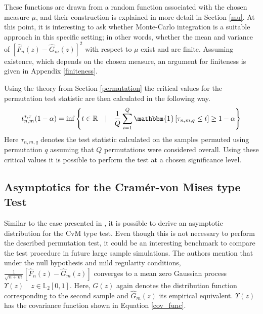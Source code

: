 \documentclass[12pt, a4paper]{article}
\theoremstyle{MAstyle} \newtheorem{assumption}{Assumption}[section]
\theoremstyle{MAstyle} \newtheorem{definition}{Definition}[section]
\theoremstyle{MAstyle} \newtheorem{theorem}{Theorem}[section]
\begin{document}
			These functions are drawn from a random function associated with the chosen measure $\mu$, and their construction is explained in more detail in Section \ref{mu}. At this point, it is interesting to ask whether Monte-Carlo integration is a suitable approach in this specific setting; in other words, whether the mean and variance of $\left[\hat{F}_n(z) - \hat{G}_m(z)\right]^2$ with respect to $\mu$ exist and are finite.
			Assuming existence, which depends on the chosen measure, an argument for finiteness is given in Appendix \ref{finiteness}.
		
			Using the theory from Section \ref{permutation} the critical values for the permutation test statistic are then calculated in the following way. 
			\begin{equation}
				t^{*, \tau}_{n,m}(1-\alpha) = \inf \left\{t \in \mathbb{R} \quad \vert \quad \frac{1}{Q} \sum_{i = 1}^{Q} \mathbbm{1}\left[\tau_{n,m,q} \leq t\right] \geq 1 - \alpha \right\}
			\end{equation}
			Here $\tau_{n,m,q}$ denotes the test statistic calculated on the samples permuted using permutation $q$ assuming that $Q$ permutations were considered overall. Using these critical values it is possible to perform the test at a chosen significance level.
		
		\subsection{Asymptotics for the Cram\'{e}r-von Mises type Test}\label{asymp}
			Similar to the case presented in \cite{bugni_goodness--fit_2009}, it is possible to derive an asymptotic distribution for the CvM type test. Even though this is not necessary to perform the described permutation test, it could be an interesting benchmark to compare the test procedure in future large sample simulations. The authors mention that under the null hypothesis and mild regularity conditions, $\frac{1}{\sqrt{n+m}}\left[\hat{F}_n(z) - \hat{G}_m(z)\right]$ converges to a mean zero Gaussian process $\Upsilon(z) \quad z \in \mathbb{L}_2[0,1]$. Here, $G(z)$ again denotes the distribution function corresponding to the second sample and $\hat{G}_m(z)$ its empirical equivalent. $\Upsilon(z)$ has the covariance function shown in Equation \ref{cov_func}. 
			
\end{document}
